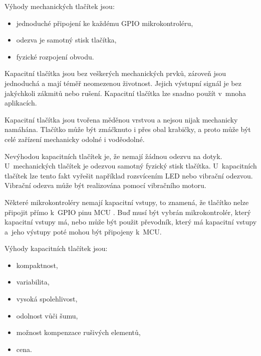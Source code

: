 
Výhody mechanických tlačítek jsou:
\begin{itemize}
  \item jednoduché připojení ke každému GPIO mikrokontroléru,
  \item odezva je samotný stisk tlačítka,
  \item fyzické rozpojení obvodu.
\end{itemize}

Kapacitní tlačítka jsou bez veškerých mechanických prvků, zároveň jsou jednoduchá a mají téměř neomezenou 
životnost. Jejich výstupní signál je bez jakýchkoli zákmitů nebo rušení. Kapacitní tlačítka lze snadno použít v~mnoha aplikacích. 

Kapacitní tlačítka jsou tvořena měděnou vrstvou a nejsou nijak mechanicky namáhána. Tlačítko může být zmáčknuto i přes 
obal krabičky, a proto může být celé zařízení mechanicky odolné i voděodolné. 

Nevýhodou kapacitních tlačítek je, že nemají žádnou odezvu na dotyk. U~mechanických tlačítek je odezvou samotný fyzický 
stisk tlačítka. U~kapacitních tlačítek lze tento fakt vyřešit například rozsvícením LED nebo vibrační odezvou. Vibrační 
odezva může být realizována pomocí vibračního motoru. 

Některé mikrokontroléry nemají kapacitní vstupy, to znamená, že tlačítko nelze připojit přímo k~GPIO pinu MCU \cite{ESP_C3_dtsh}. 
Buď musí být vybrán mikrokontrolér, který kapacitní vstupy má, nebo může být použit převodník, který má kapacitní vstupy a~jeho 
výstupy poté mohou být připojeny k~MCU. 

Výhody kapacitních tlačítek jsou:
\begin{itemize}
  \item kompaktnost,
  \item variabilita,
  \item vysoká spolehlivost,
  \item odolnost vůči šumu,
  \item možnost kompenzace rušivých elementů,
  \item cena. 
\end{itemize}

